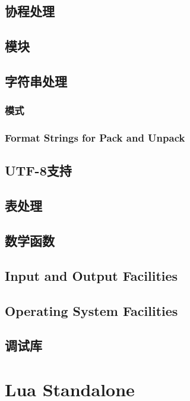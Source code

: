 \documentclass{ctexart}
\begin{document}
\subsection{协程处理}

\subsection{模块}

\subsection{字符串处理}

\subsubsection{模式}

\subsubsection{Format Strings for Pack and Unpack}

\subsection{UTF-8支持}

\subsection{表处理}

\subsection{数学函数}

\subsection{Input and Output Facilities}

\subsection{Operating System Facilities}

\subsection{调试库}

\section{Lua Standalone}
\end{document}

